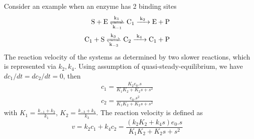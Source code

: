 Consider an example when an enzyme has 2 binding sites
\begin{equation}
  \label{eq:269}
  \begin{split}
    \ce{S + E <=>[k_1][k_{-1}] C1 ->[k_2] E + P } \\
    \ce{C1 + S <=>[k_3][k_{-3}] C2 ->[k_4] C1 + P } 
  \end{split}
\end{equation}
The reaction velocity of the systems as determined by two slower
reactions, which is represented via $k_2, k_4$. Using assumption of
quasi-steady-equilibrium, we have $dc_1/dt=dc_2/dt=0$, then
\begin{equation}
  \label{eq:1372}
  \begin{split}
    c_1 = \frac{K_2e_0.s}{K_1K_2+K_2s+s^2} \\
    c_2 = \frac{e_0.s^2}{K_1K_2+K_2s+s^2}
  \end{split}
\end{equation}
with $K_1=\frac{k_{-1}+k_2}{k_1}$, $K_2=\frac{k_{-3}+k_4}{k_3}$. The
reaction velocity is defined as
\begin{equation}
  \label{eq:1373}
  v = k_2c_1 + k_4c_2 = \frac{(k_2K_2+k_4s)e_0.s}{K_1K_2+K_2s+s^2}
\end{equation}
